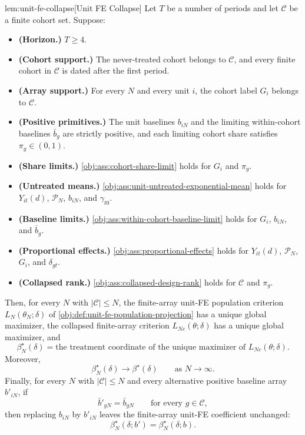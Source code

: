 \documentclass[11pt]{article}
\begin{document}
\begin{propositionv}{lem:unit-fe-collapse}[Unit FE Collapse]
Let $T$ be a number of periods and let $\mathcal C$ be a finite cohort set. Suppose:
\begin{itemize}
\item \textbf{(Horizon.)} $T\ge 4$.
\item \textbf{(Cohort support.)} The never-treated cohort belongs to $\mathcal C$, and every finite cohort in $\mathcal C$ is dated after the first period.
\item \textbf{(Array support.)} For every $N$ and every unit $i$, the cohort label $G_i$ belongs to $\mathcal C$.
\item \textbf{(Positive primitives.)} The unit baselines $b_{iN}$ and the limiting within-cohort baselines $\bar b_g$ are strictly positive, and each limiting cohort share satisfies $\pi_g\in(0,1)$.
\item \textbf{(Share limits.)} \cref{obj:ass:cohort-share-limit} holds for $G_i$ and $\pi_g$.
\item \textbf{(Untreated means.)} \cref{obj:ass:unit-untreated-exponential-mean} holds for $Y_{it}(d)$, $\mathcal P_N$, $b_{iN}$, and $\gamma_{t0}$.
\item \textbf{(Baseline limits.)} \cref{obj:ass:within-cohort-baseline-limit} holds for $G_i$, $b_{iN}$, and $\bar b_g$.
\item \textbf{(Proportional effects.)} \cref{obj:ass:proportional-effects} holds for $Y_{it}(d)$, $\mathcal P_N$, $G_i$, and $\delta_{gt}$.
\item \textbf{(Collapsed rank.)} \cref{obj:ass:collapsed-design-rank} holds for $\mathcal C$ and $\pi_g$.
\end{itemize}
Then, for every $N$ with $|\mathcal C|\le N$, the finite-array unit-FE population criterion $L_N(\theta_N;\delta)$ of \cref{obj:def:unit-fe-population-projection} has a unique global maximizer, the collapsed finite-array criterion $L_{Nc}(\theta;\delta)$ has a unique global maximizer, and
\[
\beta_N^\star(\delta)
=
\text{the treatment coordinate of the unique maximizer of }L_{Nc}(\theta;\delta).
\]
Moreover,
\[
\beta_N^\star(\delta)\longrightarrow \beta^\star(\delta)
\qquad\text{as }N\to\infty .
\]
Finally, for every $N$ with $|\mathcal C|\le N$ and every alternative positive baseline array $b'_{iN}$, if
\[
\bar b'_{gN}=\bar b_{gN}
\qquad\text{for every }g\in\mathcal C,
\]
then replacing $b_{iN}$ by $b'_{iN}$ leaves the finite-array unit-FE coefficient unchanged:
\[
\beta_N^\star(\delta;b')=\beta_N^\star(\delta;b).
\]
\end{propositionv}
\end{document}
